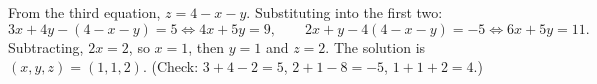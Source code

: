 From the third equation, $z=4-x-y$. Substituting into the first two:
\[3x+4y-(4-x-y)=5\iff 4x+5y=9,\qquad 2x+y-4(4-x-y)=-5\iff 6x+5y=11 .\]
Subtracting, $2x=2$, so $x=1$, then $y=1$ and $z=2$. The solution is $\boxed{(x,y,z)=(1,1,2)}$. (Check: $3+4-2=5$, $2+1-8=-5$, $1+1+2=4$.)
